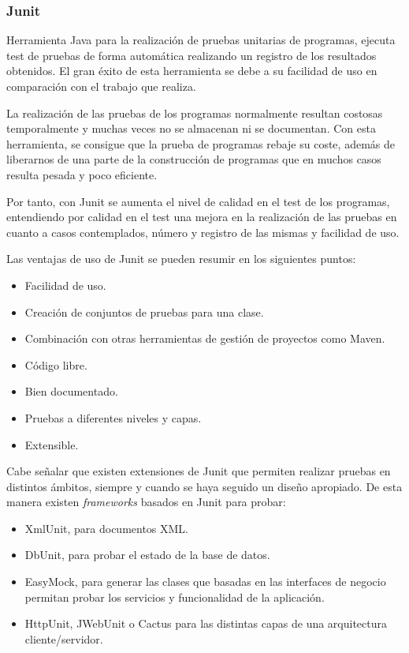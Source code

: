 \subsubsection{Junit}\label{junit}
Herramienta Java para la realización de pruebas unitarias de
programas, ejecuta test de pruebas de forma automática realizando un registro de
los resultados obtenidos. El gran éxito de esta herramienta se debe a su
facilidad de uso en comparación con el trabajo que realiza.

La realización de las pruebas de los programas normalmente resultan costosas
temporalmente y muchas veces no se almacenan ni se documentan. Con esta
herramienta, se consigue que la prueba de programas rebaje su coste, además de
liberarnos de una parte de la construcción de programas que en muchos casos
resulta pesada y poco eficiente.

Por tanto, con Junit se aumenta el nivel de calidad en el test de los programas,
entendiendo por calidad en el test una mejora en la realización de
las pruebas en cuanto a casos contemplados, número y registro de las mismas y facilidad de uso.

Las ventajas de uso de Junit se pueden resumir en los siguientes puntos:
\begin{itemize}
\item Facilidad de uso.
\item  Creación de conjuntos de pruebas para una clase.
\item  Combinación con otras herramientas de gestión de proyectos como Maven.
\item  Código libre.
\item  Bien documentado.
\item  Pruebas a diferentes niveles y capas.
\item  Extensible.
\end{itemize}

Cabe señalar que existen extensiones de Junit que permiten realizar pruebas en
distintos ámbitos, siempre y cuando se haya seguido un diseño apropiado. 
De esta manera existen \textit{frameworks} basados en Junit para probar:
\begin{itemize}
\item  XmlUnit, para documentos XML.
\item  DbUnit, para probar el estado de la base de datos.
\item  EasyMock, para generar las clases que basadas en las interfaces de
negocio permitan probar los servicios y funcionalidad de la aplicación.
\item  HttpUnit, JWebUnit o Cactus para las distintas capas de
una arquitectura cliente/servidor.
\end{itemize}

